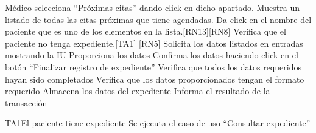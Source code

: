 \begin{UCtrayectoria}{Médico}
		\UCpaso[\UCactor] selecciona ``Próximas citas'' dando click en dicho apartado.
		\UCpaso Muestra un listado de todas las citas próximas que tiene agendadas. 
		\UCpaso[\UCactor] Da click en el nombre del paciente que es uno de los elementos en la lista.[RN13][RN8]
		\UCpaso Verifica que el paciente no tenga expediente.[TA1] [RN5]
		\UCpaso Solicita los datos listados en entradas mostrando la IU
		\UCpaso [\UCactor] Proporciona los datos
		\UCpaso [\UCactor] Confirma los datos haciendo click en el botón ``Finalizar registro de expediente''
		\UCpaso Verifica que todos los datos requeridos hayan sido completados
		\UCpaso Verifica que los datos proporcionados tengan el formato requerido
		\UCpaso Almacena los datos del expediente 
		\UCpaso Informa el resultado de la transacción
\end{UCtrayectoria}

\begin{UCtrayectoriaA}{TA1}{El paciente tiene expediente}
	\UCpaso Se ejecuta el caso de uso  ``Consultar expediente''
	
\end{UCtrayectoriaA}

